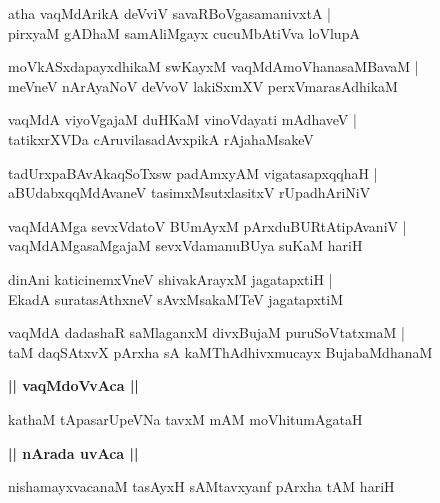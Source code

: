 \documentclass[twoside,12pt,openright]{book}
\newcounter{shloka}[chapter]
\def\uvaca#1{\centerline{{\large\textbf{#1}}}}
\begin{document}
\begin{shloka}%
atha vaqMdArikA deVviV savaRBoVgasamanivxtA |\\
pirxyaM gADhaM samAliMgayx cucuMbAtiVva loVlupA 
\end{shloka}

\begin{shloka}%
moVkASxdapayxdhikaM swKayxM vaqMdAmoVhanasaMBavaM |\\
meVneV nArAyaNoV deVvoV lakiSxmXV perxVmarasAdhikaM 
\end{shloka}

\begin{shloka}%
vaqMdA viyoVgajaM duHKaM vinoVdayati mAdhaveV |\\
tatikxrXVDa cAruvilasadAvxpikA rAjahaMsakeV 
\end{shloka}

\begin{shloka}%
tadUrxpaBAvAkaqSoTxsw padAmxyAM vigatasapxqqhaH |\\
aBUdabxqqMdAvaneV tasimxMsutxlasitxV rUpadhAriNiV 
\end{shloka}

\begin{shloka}%
vaqMdAMga sevxVdatoV BUmAyxM pArxduBURtAtipAvaniV |\\
vaqMdAMgasaMgajaM sevxVdamanuBUya suKaM hariH 
\end{shloka}

\begin{shloka}%
dinAni katicinemxVneV shivakArayxM jagatapxtiH |\\
EkadA suratasAthxneV sAvxMsakaMTeV jagatapxtiM 
\end{shloka}

\begin{shloka}%
vaqMdA dadashaR saMlaganxM divxBujaM puruSoVtatxmaM |\\
taM daqSAtxvX pArxha sA kaMThAdhivxmucayx BujabaMdhanaM 
\end{shloka}

\uvaca{|| vaqMdoVvAca ||}

\begin{shloka}%
kathaM tApasarUpeVNa tavxM mAM moVhitumAgataH 
\end{shloka}

\uvaca{|| nArada uvAca ||}

\begin{shloka}%
nishamayxvacanaM tasAyxH sAMtavxyanf pArxha tAM hariH 
\end{shloka}
\end{document}

